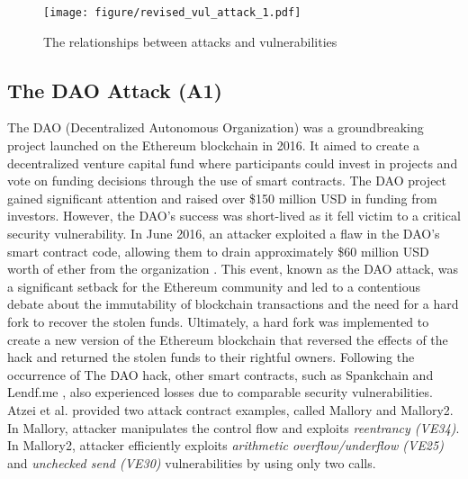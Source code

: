\documentclass[manuscript,screen]{acmart}
\begin{document}
\begin{figure}[!ht]
    \centering
    \texttt{[image: figure/revised\_vul\_attack\_1.pdf]}
    \caption{The relationships between attacks and vulnerabilities}
    \label{fig_attack}
\end{figure}

\subsection{The DAO Attack (A1)}
The DAO (Decentralized Autonomous Organization) was a groundbreaking project launched on the Ethereum blockchain in 2016. It aimed to create a decentralized venture capital fund where participants could invest in projects and vote on funding decisions through the use of smart contracts.  The DAO project gained significant attention and raised over \$150 million USD in funding from investors. However, the DAO's success was short-lived as it fell victim to a critical security vulnerability. In June 2016, an attacker exploited a flaw in the DAO's smart contract code, allowing them to drain approximately \$60 million USD worth of ether from the organization \cite{TheDAOevent}. 
This event, known as the DAO attack, was a significant setback for the Ethereum community and led to a contentious debate about the immutability of blockchain transactions and the need for a hard fork to recover the stolen funds. Ultimately, a hard fork was implemented to create a new version of the Ethereum blockchain that reversed the effects of the hack and returned the stolen funds to their rightful owners. Following the occurrence of The DAO hack, other smart contracts, such as Spankchain \cite{spankchain} and Lendf.me \cite{siliconangle}, also experienced losses due to comparable security vulnerabilities. Atzei et al. \cite{AtzeiBC17} provided two attack contract examples, called Mallory and Mallory2. In Mallory, attacker manipulates the control flow and exploits \textit{reentrancy (VE34)}. In Mallory2, attacker efficiently exploits \textit{arithmetic overflow/underflow (VE25)} and \textit{unchecked send (VE30)} vulnerabilities by using only two calls.
\end{document}
